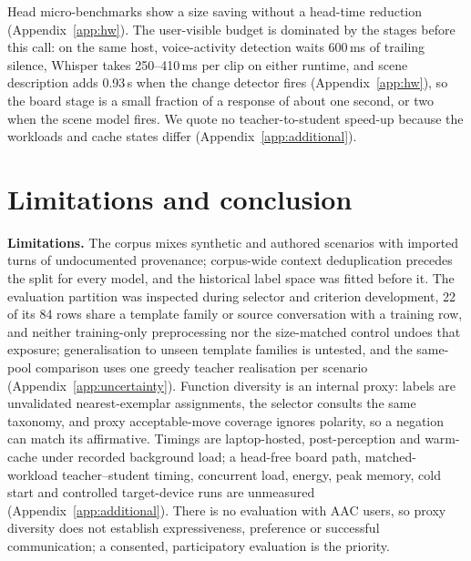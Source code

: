 Head micro-benchmarks show a size saving without a head-time reduction (Appendix~\ref{app:hw}). The user-visible budget is dominated by the stages before this call: on the same host, voice-activity detection waits 600\,ms of trailing silence, Whisper takes 250--410\,ms per clip on either runtime, and scene description adds 0.93\,s when the change detector fires (Appendix~\ref{app:hw}), so the board stage is a small fraction of a response of about one second, or two when the scene model fires. We quote no teacher-to-student speed-up because the workloads and cache states differ (Appendix~\ref{app:additional}).

\section{Limitations and conclusion}\label{sec:limits}
\textbf{Limitations.} The corpus mixes synthetic and authored scenarios with imported turns of undocumented provenance; corpus-wide context deduplication precedes the split for every model, and the historical label space was fitted before it. %
The evaluation partition was inspected during selector and criterion development, 22 of its 84 rows share a template family or source conversation with a training row, and neither training-only preprocessing nor the size-matched control undoes that exposure; generalisation to unseen template families is untested, and the same-pool comparison uses one greedy teacher realisation per scenario (Appendix~\ref{app:uncertainty}). %
Function diversity is an internal proxy: labels are unvalidated nearest-exemplar assignments, the selector consults the same taxonomy, and proxy acceptable-move coverage ignores polarity, so a negation can match its affirmative. %
Timings are laptop-hosted, post-perception and warm-cache under recorded background load; a head-free board path, matched-workload teacher--student timing, concurrent load, energy, peak memory, cold start and controlled target-device runs are unmeasured (Appendix~\ref{app:additional}). %
There is no evaluation with AAC users, so proxy diversity does not establish expressiveness, preference or successful communication; a consented, participatory evaluation is the priority. %

